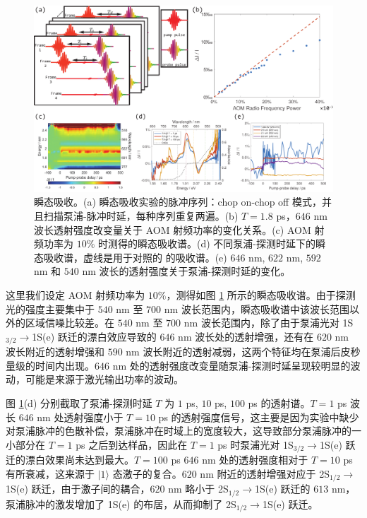\documentclass{thesis}
\begin{document}
\begin{figure}[h]
    \centering
    \includegraphics[width=1\columnwidth]{Img/Transient Absorption.pdf}
    \caption{瞬态吸收。(a) 瞬态吸收实验的脉冲序列：chop on-chop off 模式，并且扫描泵浦-脉冲时延，每种序列重复两遍。(b) $T=1.8$ ps，$646$ nm 波长透射强度改变量关于 AOM 射频功率的变化关系。(c) AOM 射频功率为 $10\%$ 时测得的瞬态吸收谱。(d) 不同泵浦-探测时延下的瞬态吸收谱，虚线是用于对照的  的吸收谱。(e) $646$ nm, $622$ nm, $592$ nm 和 $540$ nm 波长的透射强度关于泵浦-探测时延的变化。}
    \label{Transient Absorption}
\end{figure}

这里我们设定 AOM 射频功率为 $10\%$，测得如图 \ref{Transient Absorption} 所示的瞬态吸收谱。由于探测光的强度主要集中于 $540$ nm 至 $700$ nm 波长范围内，瞬态吸收谱中该波长范围以外的区域信噪比较差。在 $540$ nm 至 $700$ nm 波长范围内，除了由于泵浦光对 1S$_{3/2}\rightarrow$1S(e) 跃迁的漂白效应导致的 $646$ nm 波长处的透射增强，还有在 $620$ nm 波长附近的透射增强和 $590$ nm 波长附近的透射减弱，这两个特征均在泵浦后皮秒量级的时间内出现。$646$ nm 处的透射强度改变量随泵浦-探测时延呈现较明显的波动，可能是来源于激光输出功率的波动。

图 \ref{Transient Absorption}(d) 分别截取了泵浦-探测时延 $T$ 为 $1$ ps, $10$ ps, $100$ ps 的透射谱。$T=1$ ps 波长 $646$ nm 处透射强度小于 $T=10$ ps 的透射强度信号，这主要是因为实验中缺少对泵浦脉冲的色散补偿，泵浦脉冲在时域上的宽度较大，这导致部分泵浦脉冲的一小部分在 $T=1$ ps 之后到达样品，因此在 $T=1$ ps 时泵浦光对 1S$_{3/2}\rightarrow$1S(e) 跃迁的漂白效果尚未达到最大。$T=100$ ps $646$ nm 处的透射强度相对于 $T=10$ ps 有所衰减，这来源于 $\lvert 1\rangle$ 态激子的复合。$620$ nm 附近的透射增强对应于 2S$_{1/2}\rightarrow$1S(e) 跃迁，由于激子间的耦合，$620$ nm 略小于 2S$_{1/2}\rightarrow$1S(e) 跃迁的 $613$ nm，泵浦脉冲的激发增加了 1S(e) 的布居，从而抑制了 2S$_{1/2}\rightarrow$1S(e) 跃迁。
\end{document}
